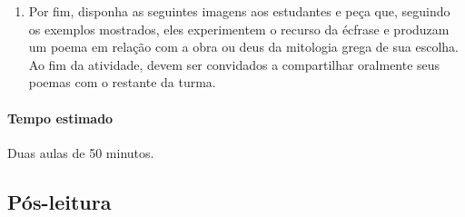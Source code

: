 \documentclass[12pt]{extarticle}
\begin{document}
\begin{enumerate}

\item
Por fim, disponha as seguintes imagens aos estudantes e peça que, seguindo os exemplos
mostrados, eles experimentem o recurso da écfrase e produzam um poema em relação
com a obra ou deus da mitologia grega de sua escolha. Ao fim da atividade, 
devem ser convidados a compartilhar oralmente seus poemas com o restante da turma.


\end{enumerate}

\paragraph{Tempo estimado} Duas aulas de 50 minutos.

\subsection{Pós-leitura}







\end{document}

